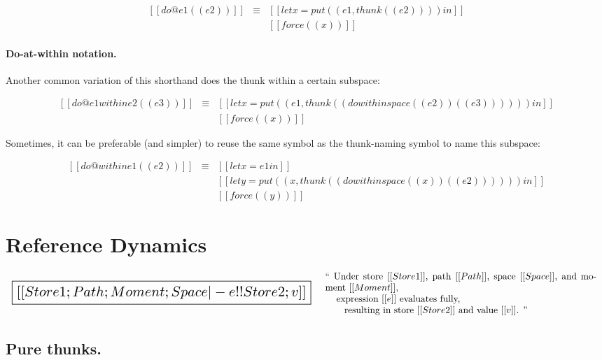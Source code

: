 \documentclass[11pt]{article}
\begin{document}
\[
\begin{array}{lcl}
  [[do @e1 ({( e2 )}) ]]
  &\equiv&
  [[let x = put((e1, thunk((e2)))) in]]
  \\
  &&[[force((x))]]
\end{array}
\]

\paragraph{Do-at-within notation.}
Another common variation of this shorthand does the thunk within a
certain subspace:

\[
\begin{array}{lcl}
  [[do @e1 within e2 ({( e3 )})]]
  &\equiv&
  [[let x = put((e1, thunk((do within space ((e2))({(e3)}) )))) in]]
  \\
  &&[[force((x))]]
\end{array}
\]

\noindent
Sometimes, it can be preferable (and simpler) to reuse the same symbol
as the thunk-naming symbol to name this subspace:

\[
\begin{array}{lcl}
  [[do @within e1 ({( e2 )})]]
  &\equiv&
  [[let x = e1 in]]
  \\
  &&[[let y = put((x, thunk((do within space ((x))({(e2)}))))) in]]
  \\
  &&[[force((y))]]
\end{array}
\]

\section{Reference Dynamics}
\label{sec:reference-dynamics}

\[
\begin{array}{lc}
\scalebox{1.5}{\boxed{
  [[Store1; Path; Moment; Space |- e !! Store2; v]]
}}
&
\begin{array}{p{4in}}
  ``
  Under store~$[[Store1]]$,
  path~$[[Path]]$,
  space~$[[Space]]$,
  and
  moment~$[[Moment]]$,\\
  \hspace{3mm}~expression~$[[e]]$ evaluates fully,\\
  \hspace{6mm}~resulting in store~$[[Store2]]$ and value~$[[v]]$.
  ''
\end{array}
\end{array}
\]


\subsection{Pure thunks.}
\end{document}
